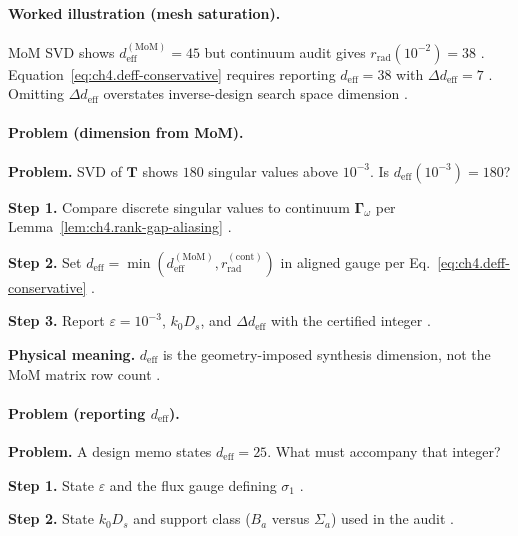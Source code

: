 \paragraph{Worked illustration (mesh saturation).}
MoM SVD shows \(d_{\mathrm{eff}}^{\mathrm{(MoM)}}=45\) but continuum audit gives \(r_{\mathrm{rad}}(10^{-2})=38\)
\cite{harrington2001,hansen1988,devaney2004}. Equation~\eqref{eq:ch4.deff-conservative} requires reporting \(d_{\mathrm{eff}}=38\) with
\(\Delta d_{\mathrm{eff}}=7\) \cite{stratton1941,collin2001,jackson1999}. Omitting \(\Delta d_{\mathrm{eff}}\) overstates inverse-design
search space dimension \cite{hansen1988,harrington2001}.

\paragraph{Problem (dimension from MoM).}
\textbf{Problem.} SVD of \(\mathbf{T}\) shows \(180\) singular values above \(10^{-3}\). Is \(d_{\mathrm{eff}}(10^{-3})=180\)?

\textbf{Step 1.} Compare discrete singular values to continuum \(\boldsymbol{\Gamma}_\omega\) per Lemma~\ref{lem:ch4.rank-gap-aliasing}
\cite{harrington2001,devaney2004,hansen1988}.

\textbf{Step 2.} Set \(d_{\mathrm{eff}}=\min(d_{\mathrm{eff}}^{\mathrm{(MoM)}},r_{\mathrm{rad}}^{\mathrm{(cont)}})\) in aligned gauge per
Eq.~\eqref{eq:ch4.deff-conservative} \cite{stratton1941,jackson1999,collin2001}.

\textbf{Step 3.} Report \(\varepsilon=10^{-3}\), \(k_{0}D_{s}\), and \(\Delta d_{\mathrm{eff}}\) with the certified integer
\cite{hansen1988,harrington2001,devaney2004}.

\textbf{Physical meaning.} \(d_{\mathrm{eff}}\) is the geometry-imposed synthesis dimension, not the MoM matrix row count
\cite{hansen1988,stratton1941}.

\paragraph{Problem (reporting \(d_{\mathrm{eff}}\)).}
\textbf{Problem.} A design memo states \(d_{\mathrm{eff}}=25\). What must accompany that integer?

\textbf{Step 1.} State \(\varepsilon\) and the flux gauge defining \(\sigma_{1}\) \cite{hansen1988,stratton1941,harrington2001}.

\textbf{Step 2.} State \(k_{0}D_{s}\) and support class (\(B_{a}\) versus \(\Sigma_{a}\)) used in the audit \cite{jackson1999,collin2001,devaney2004}.

